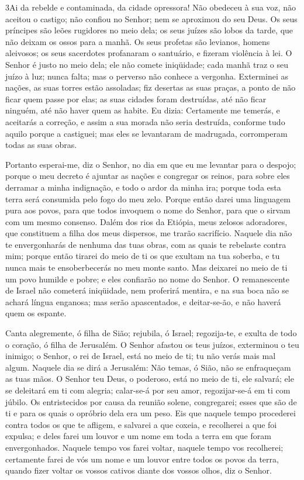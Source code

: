 \lettrine{3} Ai da rebelde e contaminada, da cidade opressora!
Não obedeceu à sua voz, não aceitou o castigo; não confiou no
Senhor; nem se aproximou do seu Deus. Os seus príncipes são
leões rugidores no meio dela; os seus juízes são lobos da tarde, que
não deixam os ossos para a manhã. Os seus profetas são levianos,
homens aleivosos; os seus sacerdotes profanaram o santuário, e
fizeram violência à lei. O Senhor é justo no meio dela; ele não
comete iniqüidade; cada manhã traz o seu juízo à luz; nunca falta;
mas o perverso não conhece a vergonha. Exterminei as nações, as
suas torres estão assoladas; fiz desertas as suas praças, a ponto de
não ficar quem passe por elas; as suas cidades foram destruídas, até
não ficar ninguém, até não haver quem as habite. Eu dizia:
Certamente me temerás, e aceitarás a correção, e assim a sua morada
não seria destruída, conforme tudo aquilo porque a castiguei; mas
eles se levantaram de madrugada, corromperam todas as suas obras.

Portanto esperai-me, diz o Senhor, no dia em que eu me levantar
para o despojo; porque o meu decreto é ajuntar as nações e congregar
os reinos, para sobre eles derramar a minha indignação, e todo o
ardor da minha ira; porque toda esta terra será consumida pelo fogo
do meu zelo. Porque então darei uma linguagem pura aos povos,
para que todos invoquem o nome do Senhor, para que o sirvam com um
mesmo consenso. Dalém dos rios da Etiópia, meus zelosos
adoradores, que constituem a filha dos meus dispersos, me trarão
sacrifício. Naquele dia não te envergonharás de nenhuma das
tuas obras, com as quais te rebelaste contra mim; porque então
tirarei do meio de ti os que exultam na tua soberba, e tu nunca mais
te ensoberbecerás no meu monte santo. Mas deixarei no meio de
ti um povo humilde e pobre; e eles confiarão no nome do Senhor.
O remanescente de Israel não cometerá iniqüidade, nem
proferirá mentira, e na sua boca não se achará língua enganosa; mas
serão apascentados, e deitar-se-ão, e não haverá quem os espante.

Canta alegremente, ó filha de Sião; rejubila, ó Israel;
regozija-te, e exulta de todo o coração, ó filha de Jerusalém.
O Senhor afastou os teus juízos, exterminou o teu inimigo; o
Senhor, o rei de Israel, está no meio de ti; tu não verás mais mal
algum. Naquele dia se dirá a Jerusalém: Não temas, ó Sião,
não se enfraqueçam as tuas mãos. O Senhor teu Deus, o
poderoso, está no meio de ti, ele salvará; ele se deleitará em ti
com alegria; calar-se-á por seu amor, regozijar-se-á em ti com
júbilo. Os entristecidos por causa da reunião solene,
congregarei; esses que são de ti e para os quais o opróbrio dela era
um peso. Eis que naquele tempo procederei contra todos os que
te afligem, e salvarei a que coxeia, e recolherei a que foi expulsa;
e deles farei um louvor e um nome em toda a terra em que foram
envergonhados. Naquele tempo vos farei voltar, naquele tempo
vos recolherei; certamente farei de vós um nome e um louvor entre
todos os povos da terra, quando fizer voltar os vossos cativos
diante dos vossos olhos, diz o Senhor.

